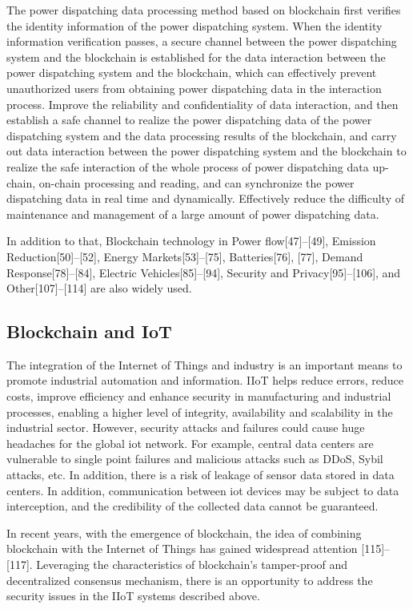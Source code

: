 \documentclass[lettersize,journal]{IEEEtran}
\begin{document}
The power dispatching data processing method based on blockchain first verifies the identity information of the power dispatching system. When the identity information verification passes, a secure channel between the power dispatching system and the blockchain is established for the data interaction between the power dispatching system and the blockchain, which can effectively prevent unauthorized users from obtaining power dispatching data in the interaction process. Improve the reliability and confidentiality of data interaction, and then establish a safe channel to realize the power dispatching data of the power dispatching system and the data processing results of the blockchain, and carry out data interaction between the power dispatching system and the blockchain to realize the safe interaction of the whole process of power dispatching data up-chain, on-chain processing and reading, and can synchronize the power dispatching data in real time and dynamically. Effectively reduce the difficulty of maintenance and management of a large amount of power dispatching data.

In addition to that, Blockchain technology in Power flow[47]–[49], Emission Reduction[50]–[52], Energy Markets[53]–[75], Batteries[76], [77], Demand Response[78]–[84], Electric Vehicles[85]–[94], Security and Privacy[95]–[106], and Other[107]–[114] are also widely used.
\subsection{Blockchain and IoT}
The integration of the Internet of Things and industry is an important means to promote industrial automation and information. IIoT helps reduce errors, reduce costs, improve efficiency and enhance security in manufacturing and industrial processes, enabling a higher level of integrity, availability and scalability in the industrial sector. However, security attacks and failures could cause huge headaches for the global iot network. For example, central data centers are vulnerable to single point failures and malicious attacks such as DDoS, Sybil attacks, etc. In addition, there is a risk of leakage of sensor data stored in data centers. In addition, communication between iot devices may be subject to data interception, and the credibility of the collected data cannot be guaranteed.

In recent years, with the emergence of blockchain, the idea of combining blockchain with the Internet of Things has gained widespread attention [115]–[117]. Leveraging the characteristics of blockchain's tamper-proof and decentralized consensus mechanism, there is an opportunity to address the security issues in the IIoT systems described above.
\end{document}
